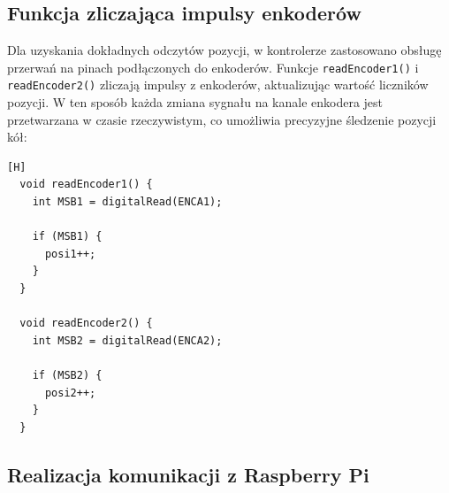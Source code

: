 \subsection{Funkcja zliczająca impulsy enkoderów}

Dla uzyskania dokładnych odczytów pozycji, w kontrolerze zastosowano obsługę przerwań na pinach podłączonych do enkoderów. Funkcje \texttt{readEncoder1()} i \texttt{readEncoder2()} zliczają impulsy z enkoderów, aktualizując wartość liczników pozycji. W ten sposób każda zmiana sygnału na kanale enkodera jest przetwarzana w czasie rzeczywistym, co umożliwia precyzyjne śledzenie pozycji kół:

\vspace*{0.5cm}


\begin{lstlisting}[caption=Funkcja zliczająca impulsy enkodera, label=fig:enc-count, captionpos=b][H]
  void readEncoder1() {
    int MSB1 = digitalRead(ENCA1);

    if (MSB1) {  
      posi1++;  
    }
  }

  void readEncoder2() {
    int MSB2 = digitalRead(ENCA2);

    if (MSB2) {  
      posi2++; 
    }
  }
\end{lstlisting}


\subsection{Realizacja komunikacji z Raspberry Pi}



